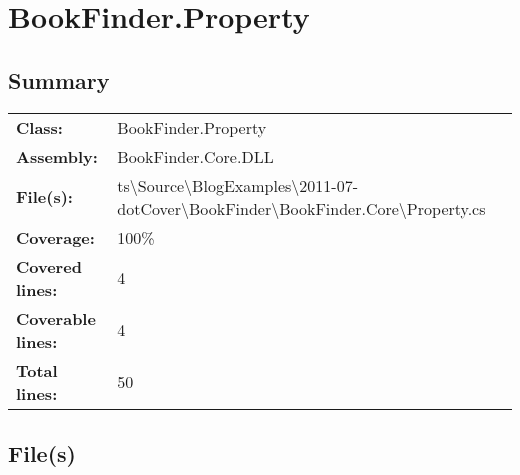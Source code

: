 \documentclass[a4paper,10pt]{article}
\begin{document}
\section{BookFinder.Property}
\subsection{Summary}
\begin{longtable}[l]{ll}
\textbf{Class:} & BookFinder.Property\\
\textbf{Assembly:} & BookFinder.Core.DLL\\
\textbf{File(s):} & \begin{minipage}[t]{12cm}{ts\textbackslash Source\textbackslash BlogExamples\textbackslash 2011-07-dotCover\textbackslash BookFinder\textbackslash BookFinder.Core\textbackslash Property.cs}\end{minipage} \\
\textbf{Coverage:} & 100\%\\
\textbf{Covered lines:} & 4\\
\textbf{Coverable lines:} & 4\\
\textbf{Total lines:} & 50\\
\end{longtable}
\subsection{File(s)}
\end{document}

